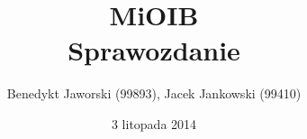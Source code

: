 \documentclass[a4paper,10pt]{article}
\author{Benedykt Jaworski (99893), Jacek Jankowski (99410)}
\title{MiOIB\\ 
\large{{\bf Sprawozdanie}}}
\date{3 litopada 2014}
\begin{document}
\begin{center}





 

 







\end{center}
\end{document}
